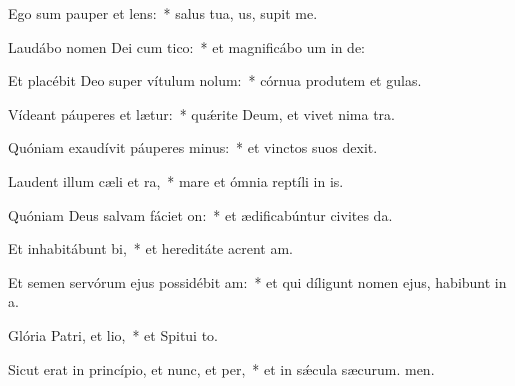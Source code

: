 \item Ego sum pauper et lens:~* salus tua, us, supit me.
\item Laudábo nomen Dei cum tico:~* et magnificábo um in de:
\item Et placébit Deo super vítulum nolum:~* córnua produtem et gulas.
\item Vídeant páuperes et lætur:~* quǽrite Deum, et vivet nima tra.
\item Quóniam exaudívit páuperes minus:~* et vinctos suos  dexit.
\item Laudent illum cæli et ra,~* mare et ómnia reptíli in is.
\item Quóniam Deus salvam fáciet on:~* et ædificabúntur civites da.
\item Et inhabitábunt bi,~* et hereditáte acrent am.
\item Et semen servórum ejus possidébit am:~* et qui díligunt nomen ejus, habibunt in a.
\item Glória Patri, et lio,~* et Spitui to.
\item Sicut erat in princípio, et nunc, et per,~* et in sǽcula sæcurum. men.
